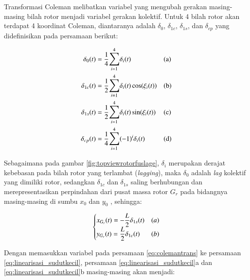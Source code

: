 Transformasi Coleman melibatkan variabel yang mengubah gerakan masing-masing bilah rotor menjadi variabel gerakan kolektif. Untuk 4 bilah rotor akan terdapat 4 koordinat Coleman, diantaranya adalah $\delta_0$, $\delta_{1c}$, $\delta_{1s}$, dan $\delta_{cp}$ yang didefinisikan pada persamaan berikut:

\begin{equation}
\begin{aligned}
	\delta_0(t) &= \frac{1}{4}\mathlarger{\sum}_{i=1}^{4}\delta_i(t) && \text{(a)} \\
	\delta_{1c}(t) &= \frac{1}{2}\mathlarger{\sum}_{i=1}^{4}\delta_i(t) \cos(\xi_i(t)) && \text{(b)}\\
	\delta_{1s}(t) &= \frac{1}{2}\mathlarger{\sum}_{i=1}^{4}\delta_i(t) \sin(\xi_i(t)) && \text{(c)}\\
	\delta_{cp}(t) &= \frac{1}{4}\mathlarger{\sum}_{i=1}^{4}(-1)^i\delta_i(t) && \text{(d)}
\end{aligned}
\label{eq:colemantrans}
\end{equation}

Sebagaimana pada gambar \ref{fig:topviewrotorfuslage}, $\delta_i$ merupakan derajat kebebasan pada bilah rotor yang terlambat (\textit{lagging}), maka $\delta_0$ adalah \textit{lag} kolektif yang dimiliki rotor, sedangkan $\delta_{1c}$ dan $\delta_{1s}$ saling berhubungan dan merepresentasikan perpindahan dari pusat massa rotor $G_r$ pada bidangnya masing-masing di sumbu $x_0$ dan $y_0$ \cite{inproceedings}, sehingga:

\begin{equation}
	\begin{cases}
		x_{G_r}(t) = -\mathlarger{\frac{L}{2}}\delta_{1s}(t)&(a) \\ 
		y_{G_r}(t) = \mathlarger{\frac{L}{2}}\delta_{1c}(t)&(b)
	\end{cases}
	\label{eq:pusatmassarotor}
\end{equation}

Dengan memasukkan variabel pada persamaan \ref{eq:colemantrans} ke persamaan \ref{eq:linearisasi_sudutkecil}, persamaan \ref{eq:linearisasi_sudutkecil}a dan \ref{eq:linearisasi_sudutkecil}b masing-masing akan menjadi:

